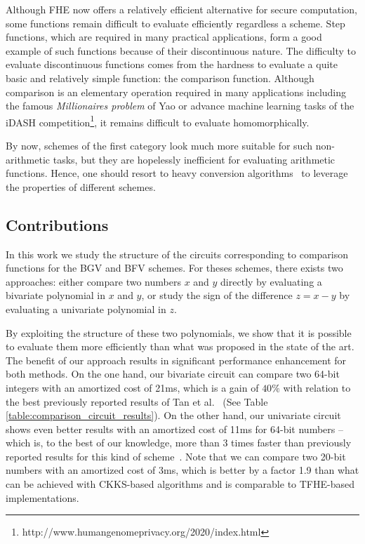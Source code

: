 Although \ac{FHE} now offers a relatively efficient alternative for secure computation, some functions remain difficult to evaluate efficiently regardless a scheme. 
Step functions, which are required in many practical applications, form a good example of such functions because of their discontinuous nature. 
The difficulty to evaluate discontinuous functions comes from the hardness to evaluate a quite basic and relatively simple function: the comparison function. 
Although comparison is an elementary operation required in many applications including the famous \emph{Millionaires problem} of Yao \cite{Yao82} or advance machine learning tasks of the iDASH competition\footnote{http://www.humangenomeprivacy.org/2020/index.html}, it remains difficult to evaluate homomorphically.

By now, schemes of the first category look much more suitable for such non-arithmetic tasks, but they are hopelessly inefficient for evaluating arithmetic functions.
Hence, one should resort to heavy conversion algorithms~\cite{JMC:BGGJ20} to leverage the properties of different schemes. 

\subsection{Contributions}
In this work we study the structure of the circuits corresponding to comparison functions for the BGV and BFV schemes. 
For theses schemes, there exists two approaches: either compare two numbers $x$ and $y$ directly by evaluating a bivariate polynomial in $x$ and $y$, or study the sign of the difference $z=x-y$ by evaluating a univariate polynomial in $z$.

By exploiting the structure of these two polynomials, we show that it is possible to evaluate them more efficiently than what was proposed in the state of the art. 
The benefit of our approach results in significant performance enhancement for both methods. 
On the one hand, our bivariate circuit can compare two 64-bit integers with an amortized cost of 21ms, which is a gain of $40\%$ with relation to the best previously reported results of Tan et al.~\cite{TLWRK20} (See Table \ref{table:comparison_circuit_results}). 
On the other hand, our univariate circuit shows even better results with an amortized cost of 11ms for 64-bit numbers -- which is, to the best of our knowledge, more than 3 times faster than previously reported results for this kind of scheme~\cite{TLWRK20}. 
Note that we can compare two 20-bit numbers with an amortized cost of 3ms, which is better by a factor 1.9 than what can be achieved with CKKS-based algorithms and is comparable to TFHE-based implementations.

